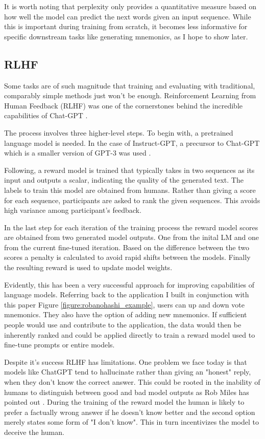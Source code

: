 It is worth noting that perplexity only provides a quantitative measure based on how well the model can predict the next words given an input sequence. While this is important during training from scratch, it becomes less informative for specific downstream tasks like generating mnemonics, as I hope to show later.

\subsection{RLHF}
Some tasks are of such magnitude that training and evaluating with traditional, comparably simple methods just won't be enough. Reinforcement Learning from Human Feedback (RLHF) was one of the cornerstones behind the incredible capabilities of Chat-GPT \cite{lambert2022rlhf}.

The process involves three higher-level steps. To begin with, a pretrained language model is needed. In the case of Instruct-GPT, a precursor to Chat-GPT which is a smaller version of GPT-3 was used \cite{lambert2022rlhf}.

Following, a reward model is trained that typically takes in two sequences as its input and outputs a scalar, indicating the quality of the generated text. The labels to train this model are obtained from humans. Rather than giving a score for each sequence, participants are asked to rank the given sequences. This avoids high variance among participant's feedback.

In the last step for each iteration of the training process the reward model scores are obtained from two generated model outputs. One from the inital LM and one from the current fine-tuned iteration. Based on the difference between the two scores a penalty is calculated to avoid rapid shifts between the models. Finally the resulting reward is used to update model weights. 

Evidently, this has been a very successful approach for improving capabilities of language models. Referring back to the application I built in conjunction with this paper Figure \ref{figure:robanohashi_example}, users can up and down vote mnemonics. They also have the option of adding new mnemonics. If sufficient people would use and contribute to the application, the data would then be inherently ranked and could be applied directly to train a reward model used to fine-tune prompts or entire models.

Despite it's success RLHF has limitations. One problem we face today is that models like ChatGPT tend to hallucinate rather than giving an "honest" reply, when they don't know the correct answer. This could be rooted in the inability of humans to distinguish between good and bad model outputs as Rob Miles has pointed out \cite{miles_chatgpt}. During the training of the reward model the human is likely to prefer a factually wrong answer if he doesn't know better and the second option merely states some form of "I don't know". This in turn incentivizes the model to deceive the human.

